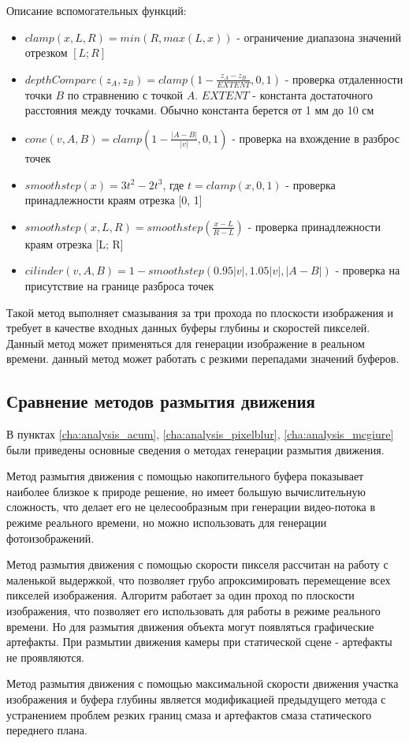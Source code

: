 Описание вспомогательных функций:
\begin{itemize}
    \item $clamp(x, L, R) = min(R, max(L, x))$ - ограничение диапазона значений отрезком $[L;R]$
    \item $depthCompare(z_A, z_B) = clamp(1 - \frac{z_A - z_B}{EXTENT}, 0, 1)$ - проверка отдаленности точки $B$ по стравнению с точкой $A$. $EXTENT$ - константа достаточного расстояния между точками. Обычно константа берется от 1 мм до 10 см \cite{McGuire12}
    \item $cone(v, A, B) = clamp(1 - \frac{|A-B|}{|v|}, 0,1)$ - проверка на вхождение в разброс точек
    \item $smoothstep(x) = 3 t^2 - 2t^3$, где $t = clamp(x, 0, 1)$ -  проверка принадлежности краям отрезка [0, 1]
    \item $smoothstep(x, L, R) = smoothstep(\frac{x - L}{R -
                  L})$ - проверка принадлежности краям отрезка [L; R]
    \item $cilinder(v, A, B) = 1 - smoothstep(0.95 |v|, 1.05|v|, |A - B|)$ - проверка на присутствие на границе разброса точек
\end{itemize}

Такой метод выполняет смазывания за три прохода по плоскости изображения и требует в качестве входных данных буферы глубины и скоростей пикселей. Данный метод может применяться для генерации изображение в реальном времени. данный метод может работать с резкими перепадами значений буферов.

\subsection{Сравнение методов размытия движения}

В пунктах \ref{cha:analysis_acum}, \ref{cha:analysis_pixelblur}, \ref{cha:analysis_mcgiure} были приведены основные сведения о методах генерации размытия движения.
\par

Метод размытия движения с помощью накопительного буфера показывает наиболее близкое к природе решение, но имеет большую вычислительную сложность, что делает его не целесообразным при генерации видео-потока в режиме реального времени, но можно использовать для генерации фотоизображений.
\par
Метод размытия движения с помощью скорости пикселя рассчитан на работу с маленькой выдержкой, что позволяет грубо апроксимировать перемещение всех пикселей изображения. Алгоритм работает за один проход по плоскости изображения, что позволяет его использовать для работы в режиме реального времени. Но для размытия движения объекта могут появляться графические артефакты. При размытии движения камеры при статической сцене - артефакты не проявляются.
\par
Метод размытия движения с помощью максимальной скорости движения участка изображения и буфера глубины является модификацией предыдущего метода с устранением проблем резких границ смаза и артефактов смаза статического переднего плана.



